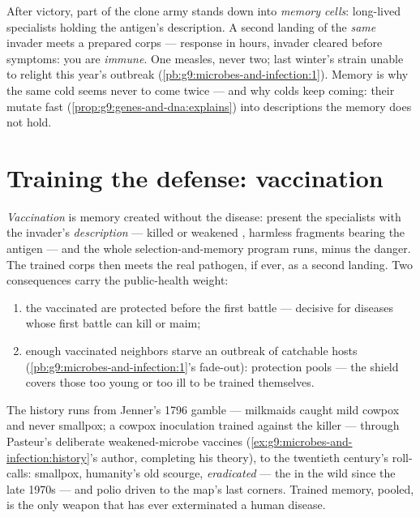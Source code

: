 \begin{definition}\label{def:g9:immune-defenses:memory}
After victory, part of the clone army stands down into
\emph{memory cells}: long-lived
specialists holding the antigen's description. A second
landing of the \emph{same} invader meets a prepared corps
--- response in hours, invader cleared before symptoms:
you are \emph{immune}. One measles,
never two; last winter's strain unable to relight this
year's outbreak
(\cref{pb:g9:microbes-and-infection:1}). Memory is why
the same cold seems never to come twice --- and why
colds keep coming: their  mutate fast
(\cref{prop:g9:genes-and-dna:explains}) into
descriptions the memory does not hold.
\end{definition}

\section{Training the defense: vaccination}

\begin{proposition}[Vaccination]\label{prop:g9:immune-defenses:vaccination}
\emph{Vaccination} is  memory
created without the disease: present the specialists with
the invader's \emph{description} --- killed or weakened
, harmless fragments bearing the antigen ---
and the whole selection-and-memory program runs, minus
the danger. The trained corps then meets the real
pathogen, if ever, as a second landing. Two consequences
carry the public-health weight:
\begin{enumerate}
  \item the vaccinated are protected before the first
        battle --- decisive for diseases whose first
        battle can kill or maim;
  \item enough vaccinated neighbors starve an outbreak
        of catchable hosts
        (\cref{pb:g9:microbes-and-infection:1}'s
        fade-out): protection pools --- the shield
        covers those too young or too ill to be trained
        themselves.
\end{enumerate}
\end{proposition}
\admitted

\begin{example}\label{ex:g9:immune-defenses:history}
The history runs from Jenner's 1796 gamble --- milkmaids
caught mild cowpox and never smallpox; a cowpox
inoculation trained against the killer --- through
Pasteur's deliberate weakened-microbe vaccines
(\cref{ex:g9:microbes-and-infection:history}'s author,
completing his theory), to the twentieth century's
roll-calls: smallpox, humanity's old scourge,
\emph{eradicated} --- the   in the wild since
the late 1970s --- and polio driven to the map's last
corners. Trained memory, pooled, is the only weapon that
has ever exterminated a human disease.
\end{example}

